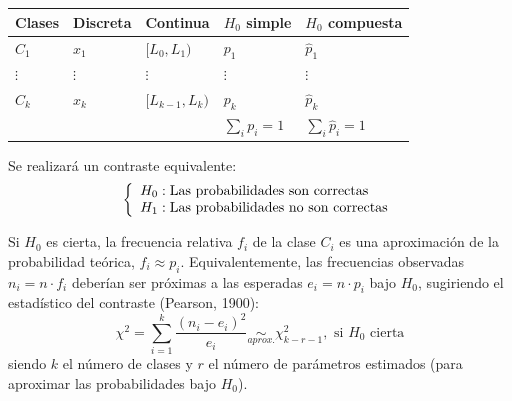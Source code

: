 \documentclass[
  spanish,
  10pt,
]{book}
\newcounter{none} %
\theoremstyle{break}
\theoremstyle{nonumberplain}
\begin{document}
{\def\LTcaptype{none} %
\begin{longtable}[]{@{}
  >{\raggedright\arraybackslash}p{}
  >{\raggedright\arraybackslash}p{}
  >{\raggedright\arraybackslash}p{}
  >{\raggedright\arraybackslash}p{}
  >{\raggedright\arraybackslash}p{}@{}}
\toprule\noalign{}
\begin{minipage}[b]{\linewidth}\raggedright
Clases
\end{minipage} & \begin{minipage}[b]{\linewidth}\raggedright
Discreta
\end{minipage} & \begin{minipage}[b]{\linewidth}\raggedright
Continua
\end{minipage} & \begin{minipage}[b]{\linewidth}\raggedright
\(H_0\) simple
\end{minipage} & \begin{minipage}[b]{\linewidth}\raggedright
\(H_0\) compuesta
\end{minipage} \\
\midrule\noalign{}
\endhead
\bottomrule\noalign{}
\endlastfoot
\(C_1\) & \(x_1\) & \([L_0,L_1)\) & \(p_1\) & \(\hat{p}_1\) \\
\(\vdots\) & \(\vdots\) & \(\vdots\) & \(\vdots\) & \(\vdots\) \\
\(C_{k}\) & \(x_{k}\) & \([L_{k-1},L_{k})\) & \(p_{k}\) & \(\hat{p}_{k}\) \\
& & & \(\sum_{i}p_{i}=1\) & \(\sum_{i}\hat{p}_{i}=1\) \\
\end{longtable}
}

Se realizará un contraste equivalente:
\[\left\{ \begin{array}[c]{l}
H_0:\text{Las probabilidades son correctas}\\
H_1:\text{Las probabilidades no son correctas}
\end{array} \right.\]

Si \(H_0\) es cierta, la frecuencia relativa \(f_{i}\) de la clase \(C_{i}\) es una aproximación de la probabilidad teórica, \(f_{i}\approx p_{i}\).
Equivalentemente, las frecuencias observadas \(n_{i}=n\cdot f_{i}\) deberían ser próximas a las esperadas \(e_{i}=n\cdot p_{i}\) bajo \(H_0\), sugiriendo el estadístico del contraste (Pearson, 1900):
\[\chi^2=\sum_{i=1}^{k}\frac{(n_{i}-e_{i})^2}{e_{i}}\underset{aprox.}{\sim
}\chi_{k-r-1}^2,\text{ si }H_0\text{ cierta}\]
siendo \(k\) el número de clases y \(r\) el número de parámetros estimados (para aproximar las probabilidades bajo \(H_0\)).
\end{document}
